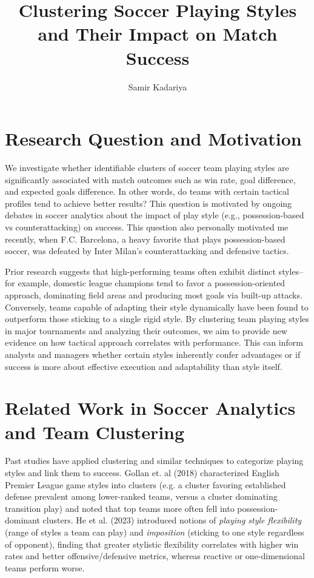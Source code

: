 \documentclass[11pt]{article}
\title{Clustering Soccer Playing Styles and Their Impact on Match Success}
\author{Samir Kadariya}
\date{}
\begin{document}
\maketitle

\section{Research Question and Motivation}
We investigate whether identifiable clusters of soccer team playing styles are significantly associated with match outcomes such as win rate, goal difference, and expected goals difference. In other words, do teams with certain tactical profiles tend to achieve better results? This question is motivated by ongoing debates in soccer analytics about the impact of play style (e.g., possession-based vs counterattacking) on success. This question also personally motivated me recently, when F.C. Barcelona, a heavy favorite that plays possession-based soccer, was defeated by Inter Milan's counterattacking and defensive tactics.
\newline

Prior research suggests that high-performing teams often exhibit distinct styles--for example, domestic league champions tend to favor a possession-oriented approach, dominating field areas and producing most goals via built-up attacks. Conversely, teams capable of adapting their style dynamically have been found to outperform those sticking to a single rigid style. By clustering team playing styles in major tournaments and analyzing their outcomes, we aim to provide new evidence on how tactical approach correlates with performance. This can inform analysts and managers whether certain styles inherently confer advantages or if success is more about effective execution and adaptability than style itself. 

\section{Related Work in Soccer Analytics and Team Clustering}
Past studies have applied clustering and similar techniques to categorize playing styles and link them to success. Gollan et. al (2018) characterized English Premier League game styles into clusters (e.g. a cluster favoring established defense prevalent among lower-ranked teams, versus a cluster dominating transition play) and noted that top teams more often fell into possession-dominant clusters. He et al. (2023) introduced notions of \textit{playing style flexibility} (range of styles a team can play) and \textit{imposition} (sticking to one style regardless of opponent), finding that greater stylistic flexibility correlates with higher win rates and better offensive/defensive metrics, whereas reactive or one-dimensional teams perform worse. 
\newline
\end{document}
